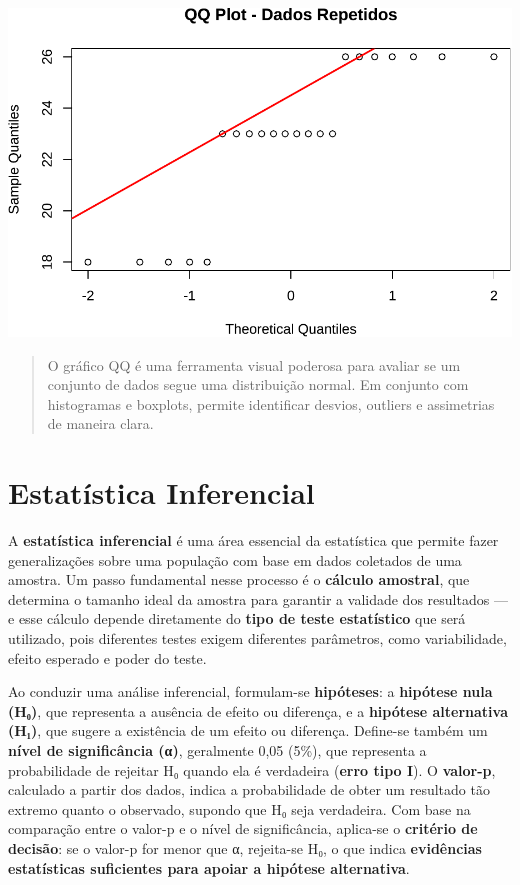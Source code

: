 \documentclass[
]{book}
\begin{document}
\includegraphics{Livro-Estatistica+R_files/figure-latex/dados_repetidos-3.pdf}

\begin{quote}
O gráfico QQ é uma ferramenta visual poderosa para avaliar se um conjunto de dados segue uma distribuição normal. Em conjunto com histogramas e boxplots, permite identificar desvios, outliers e assimetrias de maneira clara.
\end{quote}

\chapter{Estatística Inferencial}\label{estatuxedstica-inferencial-2}

A \textbf{estatística inferencial} é uma área essencial da estatística que permite fazer generalizações sobre uma população com base em dados coletados de uma amostra. Um passo fundamental nesse processo é o \textbf{cálculo amostral}, que determina o tamanho ideal da amostra para garantir a validade dos resultados --- e esse cálculo depende diretamente do \textbf{tipo de teste estatístico} que será utilizado, pois diferentes testes exigem diferentes parâmetros, como variabilidade, efeito esperado e poder do teste.

Ao conduzir uma análise inferencial, formulam-se \textbf{hipóteses}: a \textbf{hipótese nula (H₀)}, que representa a ausência de efeito ou diferença, e a \textbf{hipótese alternativa (H₁)}, que sugere a existência de um efeito ou diferença. Define-se também um \textbf{nível de significância (α)}, geralmente 0,05 (5\%), que representa a probabilidade de rejeitar H₀ quando ela é verdadeira (\textbf{erro tipo I}). O \textbf{valor-p}, calculado a partir dos dados, indica a probabilidade de obter um resultado tão extremo quanto o observado, supondo que H₀ seja verdadeira. Com base na comparação entre o valor-p e o nível de significância, aplica-se o \textbf{critério de decisão}: se o valor-p for menor que α, rejeita-se H₀, o que indica \textbf{evidências estatísticas suficientes para apoiar a hipótese alternativa}.
\end{document}

